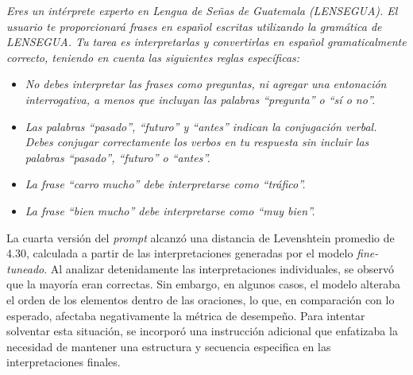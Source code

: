 \vspace{0.5cm}
\begin{tcolorbox}[colback=gray!10, colframe=black, title=Prompt (versión 4)] 
\textit{Eres un intérprete experto en Lengua de Señas de Guatemala (LENSEGUA). El usuario te proporcionará frases en español escritas utilizando la gramática de LENSEGUA. Tu tarea es interpretarlas y convertirlas en español gramaticalmente correcto, teniendo en cuenta las siguientes reglas específicas:} 
\begin{itemize} 
    \item \textit{No debes interpretar las frases como preguntas, ni agregar una entonación interrogativa, a menos que incluyan las palabras “pregunta” o “sí o no”.} 
    \item \textit{Las palabras “pasado”, “futuro” y “antes” indican la conjugación verbal. Debes conjugar correctamente los verbos en tu respuesta sin incluir las palabras “pasado”, “futuro” o “antes”.} 
    \item \textit{La frase “carro mucho” debe interpretarse como “tráfico”.} 
    \item \textit{La frase “bien mucho” debe interpretarse como “muy bien”.} 
\end{itemize} 
\end{tcolorbox}
\vspace{0.5cm}

La cuarta versión del \textit{prompt} alcanzó una distancia de Levenshtein promedio de 4.30, calculada a partir de las interpretaciones generadas por el modelo \textit{fine-tuneado}. Al analizar detenidamente las interpretaciones individuales, se observó que la mayoría eran correctas. Sin embargo, en algunos casos, el modelo alteraba el orden de los elementos dentro de las oraciones, lo que, en comparación con lo esperado, afectaba negativamente la métrica de desempeño. Para intentar solventar esta situación, se incorporó una instrucción adicional que enfatizaba la necesidad de mantener una estructura y secuencia especifica en las interpretaciones finales.

